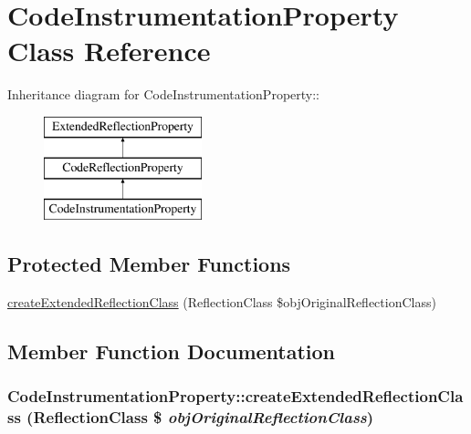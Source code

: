 \hypertarget{class_code_instrumentation_property}{
\section{CodeInstrumentationProperty Class Reference}
\label{class_code_instrumentation_property}
}
Inheritance diagram for CodeInstrumentationProperty::\begin{figure}[H]
\begin{center}
\leavevmode
\includegraphics[height=3cm]{class_code_instrumentation_property}
\end{center}
\end{figure}
\subsection*{Protected Member Functions}
\begin{CompactItemize}
\item 
\hyperlink{class_code_instrumentation_property_192bcd477b39d69274c9a7db05cc606d}{createExtendedReflectionClass} (ReflectionClass \$objOriginalReflectionClass)
\end{CompactItemize}


\subsection{Member Function Documentation}
\hypertarget{class_code_instrumentation_property_192bcd477b39d69274c9a7db05cc606d}{
\subsubsection[{createExtendedReflectionClass}]{\setlength{\rightskip}{0pt plus 5cm}CodeInstrumentationProperty::createExtendedReflectionClass (ReflectionClass \$ {\em objOriginalReflectionClass})}}
\label{class_code_instrumentation_property_192bcd477b39d69274c9a7db05cc606d}


